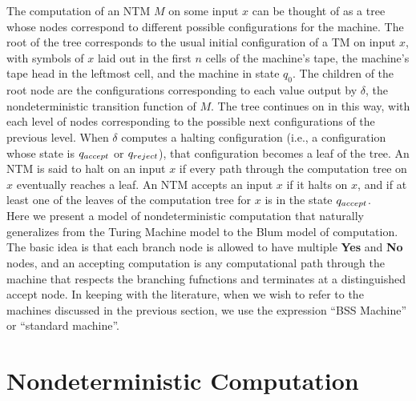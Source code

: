 The computation of an NTM $M$ on some input $x$ can be thought of as a
tree whose nodes correspond to different possible configurations for
the machine.  The root of the tree corresponds to the usual initial
configuration of a TM on input $x$, with symbols of $x$ laid out in
the first $n$ cells of the machine's tape, the machine's tape head in
the leftmost cell, and the machine in state $q_0$.  The children of
the root node are the configurations corresponding to each value
output by $\delta$, the nondeterministic transition function of $M$.
The tree continues on in this way, with each level of nodes
corresponding to the possible next configurations of the previous
level.  When $\delta$ computes a halting configuration (i.e., a
configuration whose state is $q_{accept}$ or $q_{reject}$), that
configuration becomes a leaf of the tree.  An NTM is said to halt on
an input $x$ if every path through the computation tree on $x$
eventually reaches a leaf.  An NTM accepts an input $x$ if it halts on
$x$, and if at least one of the leaves of the computation tree for $x$
is in the state $q_{accept}$.\\

Here we present a model of nondeterministic computation that naturally
generalizes from the Turing Machine model to the Blum model of
computation.  The basic idea is that each branch node is allowed to
have multiple \textbf{Yes} and \textbf{No} nodes, and an accepting
computation is any computational path through the machine that
respects the branching fufnctions and terminates at a distinguished
accept node.  In keeping with the literature, when we wish to refer to
the machines discussed in the previous section, we use the expression
``BSS Machine'' or ``standard machine''.

\section{Nondeterministic Computation}

